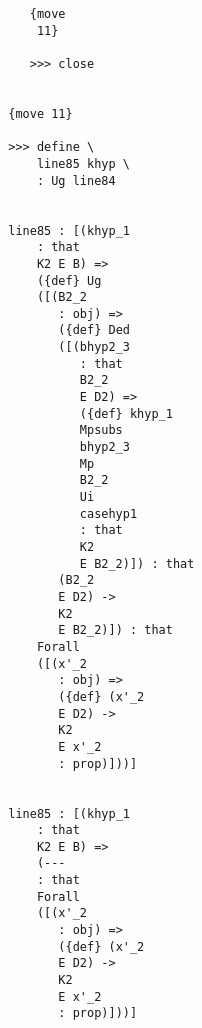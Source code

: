 \documentclass[12pt]{article}
\begin{document}
\begin{verbatim}
                                    {move 
                                     11}

                                    >>> close


                                 {move 11}

                                 >>> define \
                                     line85 khyp \
                                     : Ug line84


                                 line85 : [(khyp_1 
                                     : that 
                                     K2 E B) => 
                                     ({def} Ug 
                                     ([(B2_2 
                                        : obj) => 
                                        ({def} Ded 
                                        ([(bhyp2_3 
                                           : that 
                                           B2_2 
                                           E D2) => 
                                           ({def} khyp_1 
                                           Mpsubs 
                                           bhyp2_3 
                                           Mp 
                                           B2_2 
                                           Ui 
                                           casehyp1 
                                           : that 
                                           K2 
                                           E B2_2)]) : that 
                                        (B2_2 
                                        E D2) -> 
                                        K2 
                                        E B2_2)]) : that 
                                     Forall 
                                     ([(x'_2 
                                        : obj) => 
                                        ({def} (x'_2 
                                        E D2) -> 
                                        K2 
                                        E x'_2 
                                        : prop)]))]


                                 line85 : [(khyp_1 
                                     : that 
                                     K2 E B) => 
                                     (--- 
                                     : that 
                                     Forall 
                                     ([(x'_2 
                                        : obj) => 
                                        ({def} (x'_2 
                                        E D2) -> 
                                        K2 
                                        E x'_2 
                                        : prop)]))]



\end{verbatim}
\end{document}

